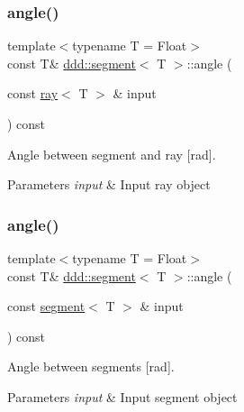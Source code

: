 \subsubsection{\texorpdfstring{angle()}{angle()}\hspace{0.1cm}{\footnotesize\ttfamily [3/4]}}
{\footnotesize\ttfamily template$<$typename T = Float$>$ \\
const T\& \hyperlink{classddd_1_1segment}{ddd\+::segment}$<$ T $>$\+::angle (\begin{DoxyParamCaption}\item[{const \hyperlink{classddd_1_1ray}{ray}$<$ T $>$ \&}]{input }\end{DoxyParamCaption}) const\hspace{0.3cm}{\ttfamily [inline]}}



Angle between segment and ray \mbox{[}rad\mbox{]}. 


\begin{DoxyParams}{Parameters}
{\em input} & Input ray object \\
\hline
\end{DoxyParams}
\mbox{\label{classddd_1_1segment_a0b19e53d6aab0dc65290874e05fbb042}} 
\subsubsection{\texorpdfstring{angle()}{angle()}\hspace{0.1cm}{\footnotesize\ttfamily [4/4]}}
{\footnotesize\ttfamily template$<$typename T = Float$>$ \\
const T\& \hyperlink{classddd_1_1segment}{ddd\+::segment}$<$ T $>$\+::angle (\begin{DoxyParamCaption}\item[{const \hyperlink{classddd_1_1segment}{segment}$<$ T $>$ \&}]{input }\end{DoxyParamCaption}) const\hspace{0.3cm}{\ttfamily [inline]}}



Angle between segments \mbox{[}rad\mbox{]}. 


\begin{DoxyParams}{Parameters}
{\em input} & Input segment object \\
\hline
\end{DoxyParams}
\mbox{\label{classddd_1_1segment_a9c33e619d61ee3fc61a7767ebc2948f5}} 
